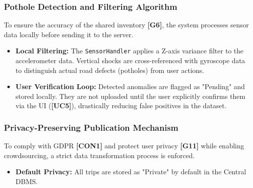 \subsubsection{Pothole Detection and Filtering Algorithm}
To ensure the accuracy of the shared inventory \textbf{[G6]}, the system processes sensor data locally before sending it to the server.
\begin{itemize}
    \item \textbf{Local Filtering:} The \texttt{SensorHandler} applies a Z-axis variance filter to the accelerometer data. Vertical shocks are cross-referenced with gyroscope data to distinguish actual road defects (potholes) from user actions.
    \item \textbf{User Verification Loop:} Detected anomalies are flagged as "Pending" and stored locally. They are not uploaded until the user explicitly confirms them via the UI (\textbf{[UC5]}), drastically reducing false positives in the dataset.
\end{itemize}

\subsubsection{Privacy-Preserving Publication Mechanism}
To comply with GDPR \textbf{[CON1]} and protect user privacy \textbf{[G11]} while enabling crowdsourcing, a strict data transformation process is enforced.
\begin{itemize}
    \item \textbf{Default Privacy:} All trips are stored as "Private" by default in the Central DBMS.
\end{itemize}